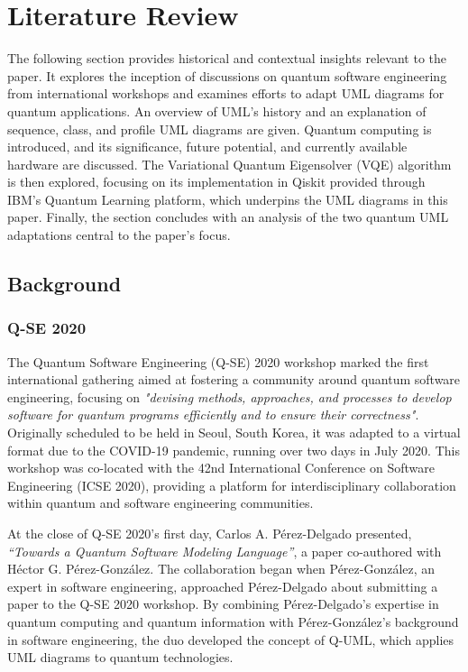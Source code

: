 \documentclass{article}
\begin{document}
{\section{Literature Review}

The following section provides historical and contextual insights relevant to the paper. It explores the inception of discussions on quantum software engineering from international workshops and examines efforts to adapt UML diagrams for quantum applications. An overview of UML's history and an explanation of sequence, class, and profile UML diagrams are given. Quantum computing is introduced, and its significance, future potential, and currently available hardware are discussed. The Variational Quantum Eigensolver (VQE) algorithm is then explored, focusing on its implementation in Qiskit provided through IBM's Quantum Learning platform, which underpins the UML diagrams in this paper. Finally, the section concludes with an analysis of the two quantum UML adaptations central to the paper's focus.

\subsection{Background}

\subsubsection{Q-SE 2020}

The Quantum Software Engineering (Q-SE) 2020 workshop marked the first international gathering aimed at fostering a community around quantum software engineering, focusing on \textit{"devising methods, approaches, and processes to develop software for quantum programs efficiently and to ensure their correctness"}\cite{QSE2020}. Originally scheduled to be held in Seoul, South Korea, it was adapted to a virtual format due to the COVID-19 pandemic, running over two days in July 2020. This workshop was co-located with the 42nd International Conference on Software Engineering (ICSE 2020), providing a platform for interdisciplinary collaboration within quantum and software engineering communities.

At the close of Q-SE 2020's first day, Carlos A. Pérez-Delgado presented, \textit{“Towards a Quantum Software Modeling Language”}\cite{Perez-Delgado2020}, a paper co-authored with Héctor G. Pérez-González. The collaboration began when Pérez-González, an expert in software engineering, approached Pérez-Delgado about submitting a paper to the Q-SE 2020 workshop. By combining Pérez-Delgado's expertise in quantum computing and quantum information with Pérez-González's background in software engineering, the duo developed the concept of Q-UML, which applies UML diagrams to quantum technologies\cite{Towards}.

}
\end{document}
